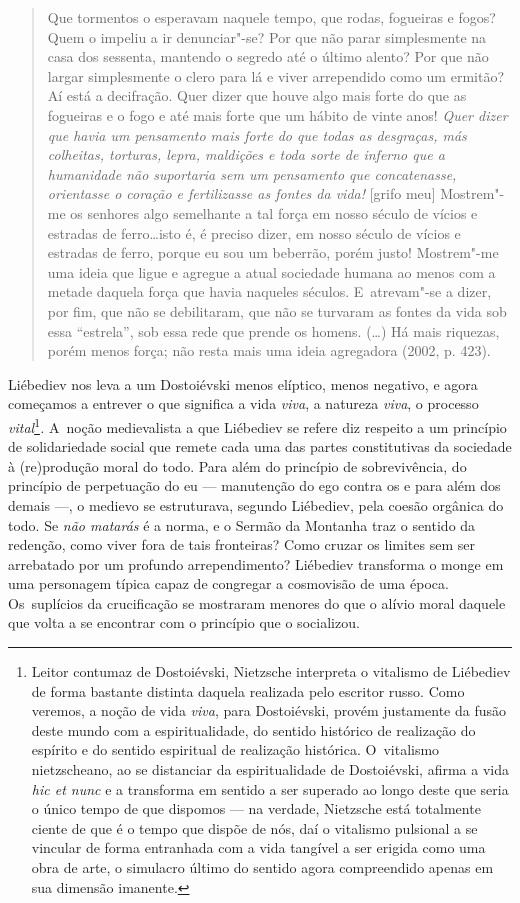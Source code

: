 \begin{quote}
Que tormentos o esperavam naquele tempo, que rodas, fogueiras e fogos?
Quem o impeliu a ir denunciar"-se? Por que não parar simplesmente na casa
dos sessenta, mantendo o segredo até o último alento? Por que não largar
simplesmente o clero para lá e viver arrependido como um ermitão? Aí
está a decifração. Quer dizer que houve algo mais forte do que as
fogueiras e o fogo e até mais forte que um hábito de vinte anos!
\emph{Quer dizer que havia um pensamento mais forte do que todas as
desgraças, más colheitas, torturas, lepra, maldições e toda sorte de
inferno que a humanidade não suportaria sem um pensamento que
concatenasse, orientasse o coração e fertilizasse as fontes da vida!}
{[}grifo meu{]} Mostrem"-me os senhores algo semelhante a tal força em
nosso século de vícios e estradas de ferro\ldots isto é, é preciso dizer,
em nosso século de vícios e estradas de ferro, porque eu sou um
beberrão, porém justo! Mostrem"-me uma ideia que ligue e agregue a atual
sociedade humana ao menos com a metade daquela força que havia naqueles
séculos. E~atrevam"-se a dizer, por fim, que não se debilitaram, que não
se turvaram as fontes da vida sob essa ``estrela'', sob essa rede que
prende os homens. (\ldots) Há mais riquezas, porém menos força; não resta
mais uma ideia agregadora (2002, p. 423).
\end{quote}

Liébediev nos leva a um Dostoiévski menos elíptico, menos negativo, e
agora começamos a entrever o que significa a vida \emph{viva}, a
natureza \emph{viva}, o processo \emph{vital}\footnote{Leitor contumaz
  de Dostoiévski, Nietzsche interpreta o vitalismo de Liébediev de forma
  bastante distinta daquela realizada pelo escritor russo. Como veremos,
  a noção de vida \emph{viva}, para Dostoiévski, provém justamente da
  fusão deste mundo com a espiritualidade, do sentido histórico de
  realização do espírito e do sentido espiritual de realização
  histórica. O~vitalismo nietzscheano, ao se distanciar da
  espiritualidade de Dostoiévski, afirma a vida \emph{hic et nunc} e a
  transforma em sentido a ser superado ao longo deste que seria o único
  tempo de que dispomos --- na verdade, Nietzsche está totalmente ciente
  de que é o tempo que dispõe de nós, daí o vitalismo pulsional a se
  vincular de forma entranhada com a vida tangível a ser erigida como
  uma obra de arte, o simulacro último do sentido agora compreendido
  apenas em sua dimensão imanente.}\emph{.} A~noção medievalista a que
Liébediev se refere diz respeito a um princípio de solidariedade social
que remete cada uma das partes constitutivas da sociedade à (re)produção
moral do todo. Para além do princípio de sobrevivência, do princípio de
perpetuação do eu --- manutenção do ego contra os e para além dos demais
---, o medievo se estruturava, segundo Liébediev, pela coesão orgânica do
todo. Se \emph{não matarás} é a norma, e o Sermão da Montanha traz o
sentido da redenção, como viver fora de tais fronteiras? Como cruzar os
limites sem ser arrebatado por um profundo arrependimento? Liébediev
transforma o monge em uma personagem típica capaz de congregar a
cosmovisão de uma época. Os~suplícios da crucificação se mostraram
menores do que o alívio moral daquele que volta a se encontrar com o
princípio que o socializou.

